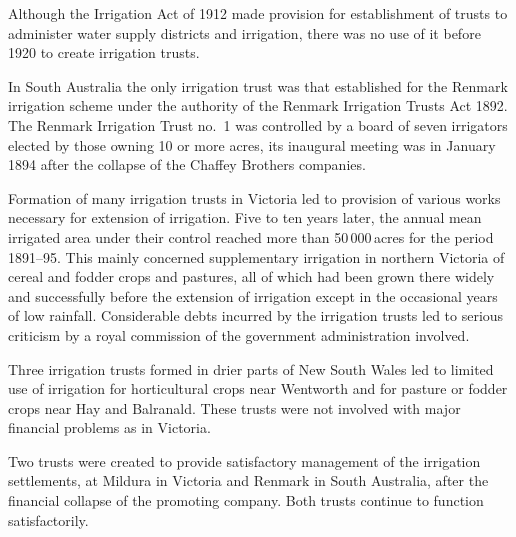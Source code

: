 Although the Irrigation Act of 1912 made provision for establishment
of trusts to administer water supply districts and irrigation, there
was no use of it before 1920 to create irrigation trusts.

In South Australia the only irrigation trust was that established for
the Renmark  irrigation scheme under the authority
of the Renmark Irrigation Trusts Act  1892.  The Renmark Irrigation Trust no.~1
 was
controlled by a board of seven irrigators elected by those owning 10
or more acres, its inaugural meeting was in January 1894 after the
collapse of the Chaffey Brothers
companies.

\closure
Formation of many irrigation trusts in Victoria led to provision of
various works necessary for extension of irrigation.  Five to ten
years later, the annual mean irrigated area under their control
reached more than 50\,000\,acres for the period 1891--95.  This mainly
concerned supplementary irrigation in northern Victoria of cereal and
fodder crops and pastures, all of which had been grown there widely
and successfully before the extension of irrigation except in the
occasional years of low rainfall.  Considerable debts incurred by the
irrigation trusts led to serious criticism by a royal commission of
the government administration involved.

Three irrigation trusts formed in drier parts of New South Wales led
to limited use of irrigation for horticultural crops near Wentworth
and for pasture or fodder crops near Hay and Balranald.  These trusts
were not involved with major financial problems as in
Victoria.

Two trusts were created to provide satisfactory management of the
irrigation settlements, at Mildura in Victoria and Renmark in South
Australia, after the financial collapse of the promoting company.
Both trusts continue to function
satisfactorily.

